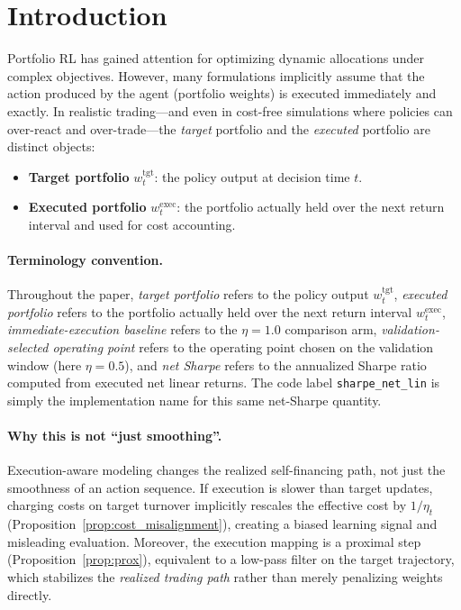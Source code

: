 \documentclass[10pt,twocolumn]{article}
\newcommand{\wexec}{w^{\mathrm{exec}}}
\newcommand{\wtgt}{w^{\mathrm{tgt}}}
\begin{document}
\section{Introduction}
Portfolio RL has gained attention for optimizing dynamic allocations under complex objectives. However, many formulations implicitly assume that the action produced by the agent (portfolio weights) is executed immediately and exactly. In realistic trading---and even in cost-free simulations where policies can over-react and over-trade---the \emph{target} portfolio and the \emph{executed} portfolio are distinct objects:
\begin{itemize}[leftmargin=*,itemsep=1pt]
\item \textbf{Target portfolio} $\wtgt_t$: the policy output at decision time $t$.
\item \textbf{Executed portfolio} $\wexec_t$: the portfolio actually held over the next return interval and used for cost accounting.
\end{itemize}

\paragraph{Terminology convention.}
Throughout the paper, \emph{target portfolio} refers to the policy output $\wtgt_t$, \emph{executed portfolio} refers to the portfolio actually held over the next return interval $\wexec_t$, \emph{immediate-execution baseline} refers to the $\eta=1.0$ comparison arm, \emph{validation-selected operating point} refers to the operating point chosen on the validation window (here $\eta=0.5$), and \emph{net Sharpe} refers to the annualized Sharpe ratio computed from executed net linear returns. The code label \texttt{sharpe\_net\_lin} is simply the implementation name for this same net-Sharpe quantity.

\paragraph{Why this is not ``just smoothing''.}
Execution-aware modeling changes the realized self-financing path, not just the smoothness of an action sequence. If execution is slower than target updates, charging costs on target turnover implicitly rescales the effective cost by $1/\eta_t$ (Proposition~\ref{prop:cost_misalignment}), creating a biased learning signal and misleading evaluation. Moreover, the execution mapping is a proximal step (Proposition~\ref{prop:prox}), equivalent to a low-pass filter on the target trajectory, which stabilizes the \emph{realized trading path} rather than merely penalizing weights directly.
\end{document}

